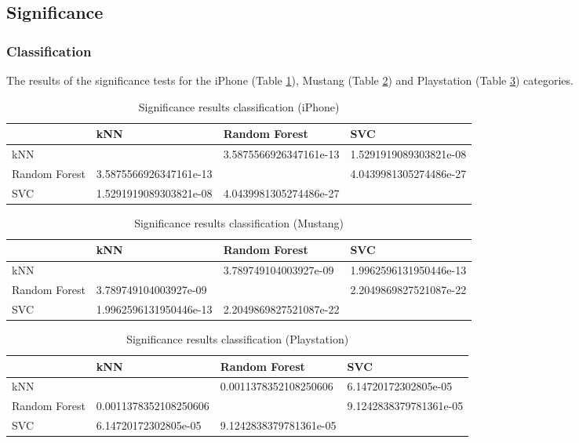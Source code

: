 \subsection{Significance}
\subsubsection{Classification}
The results of the significance tests for the iPhone (Table \ref{tab_sig_class_iphone}), Mustang (Table \ref{tab_sig_class_mustang}) and Playstation (Table \ref{tab_sig_class_playstation}) categories.
\begin{table}[h]
	\begin{center}
	\begin{tabular}{| p{3.25cm} || p{3.25cm} | p{3.25cm} | p{3.25cm} |}
		\hline
		& kNN & Random Forest & SVC \\
		\hline \hline
		kNN & & 3.5875566926347161e-13 & 1.5291919089303821e-08 \\
		\hline
		Random Forest & 3.5875566926347161e-13 & & 4.0439981305274486e-27 \\
		\hline
		SVC & 1.5291919089303821e-08 & 4.0439981305274486e-27 & \\
		\hline
	\end{tabular}
	\end{center}
	\caption{Significance results classification (iPhone)}
	\label{tab_sig_class_iphone}
\end{table}
\begin{table}[h]
	\begin{center}
	\begin{tabular}{| p{3.25cm} || p{3.25cm} | p{3.25cm} | p{3.25cm} |}
		\hline
		& kNN & Random Forest & SVC \\
		\hline \hline
		kNN & & 3.789749104003927e-09 & 1.9962596131950446e-13 \\
		\hline
		Random Forest & 3.789749104003927e-09 & & 2.2049869827521087e-22 \\
		\hline
		SVC & 1.9962596131950446e-13 & 2.2049869827521087e-22 & \\
		\hline
	\end{tabular}
	\end{center}
	\caption{Significance results classification (Mustang)}
	\label{tab_sig_class_mustang}
\end{table}
\begin{table}[h]
	\begin{center}
	\begin{tabular}{| p{3.25cm} || p{3.25cm} | p{3.25cm} | p{3.25cm} |}
		\hline
		& kNN & Random Forest & SVC \\
		\hline \hline
		kNN & & 0.0011378352108250606 & 6.14720172302805e-05 \\
		\hline
		Random Forest & 0.0011378352108250606 & & 9.1242838379781361e-05 \\
		\hline
		SVC & 6.14720172302805e-05 & 9.1242838379781361e-05 & \\
		\hline
	\end{tabular}
	\end{center}
	\caption{Significance results classification (Playstation)}
	\label{tab_sig_class_playstation}
\end{table}
